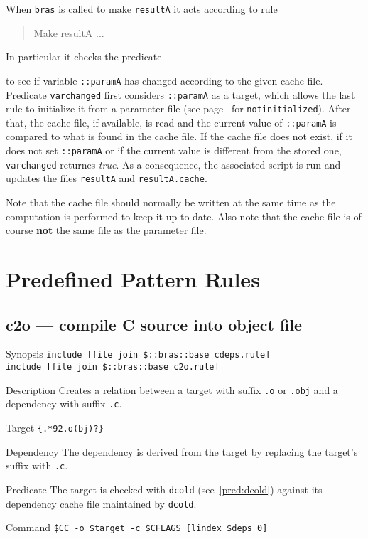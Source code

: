 \documentclass[11pt,bibtotoc,idxtotoc]{scrreprt}
\makeatletter
\newcommand{\bras}{\texttt{bras}}
\newcommand{\indextt}[1]{\index{#1@\texttt{#1}}}
\makeatother
\begin{document}
\begin{Describe}
  When \bras{} is called to make \texttt{resultA} it acts according to
  rule 
  \begin{quote}
    \ttfamily Make resultA ...
  \end{quote}
  In particular it checks the predicate 
  \begin{quote}
  \end{quote}
  to see if variable \texttt{::paramA} has changed according to the
  given cache file. Predicate \texttt{varchanged} first
  considers \texttt{::paramA} as a target, which allows the last rule
  to initialize it from a parameter file (see
  page~\pageref{pred:notinitialized} for
  \texttt{notinitialized}). After that, the cache file, if available,
  is read and the current value of \texttt{::paramA} is compared to
  what is found in the cache file. If the cache file does not exist,
  if it does not set \texttt{::paramA} or if the current value is
  different from the stored one, \texttt{varchanged} returnes
  \textit{true}. As a consequence, the associated script is run and
  updates the files \texttt{resultA} and \texttt{resultA.cache}.

  Note that the cache file should normally be written at the same time 
  as the computation is performed to keep it up-to-date. Also note
  that the cache file is of course \textbf{not} the same file as the
  parameter file.
\end{Describe}
\section{Predefined Pattern Rules}
\label{sec:rules}

\subsection{c2o --- compile C source into object file}
\label{sec:c2o}

\begin{Describe}
\item[Synopsis] \texttt{include [file join \$::bras::base cdeps.rule]}\\
\texttt{include [file join \$::bras::base c2o.rule]}
\item[Description] Creates a relation between a target with suffix
  \texttt{.o} or \texttt{.obj} and a dependency with suffix
  \texttt{.c}. 
\item[Target] \texttt{\{.*\char92.o(bj)?\}}
\item[Dependency] The dependency is derived from the target by
  replacing the target's suffix with \texttt{.c}.
\item[Predicate] The target is checked with \texttt{dcold}
  (see~\ref{pred:dcold}) against its dependency cache file maintained
  by \texttt{dcold}.
\item[Command] \texttt{\$CC -o \$target -c \$CFLAGS [lindex \$deps 0]}
\indextt{CC}\indextt{CFLAGS}
\end{Describe}
\end{document}
